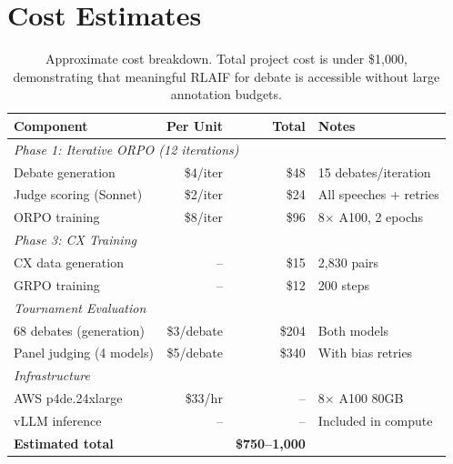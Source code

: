 \section{Cost Estimates}
\label{app:costs}

\begin{table}[h]
\centering
\small
\begin{tabular}{lrrl}
\toprule
\textbf{Component} & \textbf{Per Unit} & \textbf{Total} & \textbf{Notes} \\
\midrule
\multicolumn{4}{l}{\textit{Phase 1: Iterative ORPO (12 iterations)}} \\
Debate generation & \$4/iter & \$48 & 15 debates/iteration \\
Judge scoring (Sonnet) & \$2/iter & \$24 & All speeches + retries \\
ORPO training & \$8/iter & \$96 & 8$\times$ A100, 2 epochs \\
\midrule
\multicolumn{4}{l}{\textit{Phase 3: CX Training}} \\
CX data generation & -- & \$15 & 2,830 pairs \\
GRPO training & -- & \$12 & 200 steps \\
\midrule
\multicolumn{4}{l}{\textit{Tournament Evaluation}} \\
68 debates (generation) & \$3/debate & \$204 & Both models \\
Panel judging (4 models) & \$5/debate & \$340 & With bias retries \\
\midrule
\multicolumn{4}{l}{\textit{Infrastructure}} \\
AWS p4de.24xlarge & \$33/hr & -- & 8$\times$ A100 80GB \\
vLLM inference & -- & -- & Included in compute \\
\midrule
\textbf{Estimated total} & & \textbf{\$750--1,000} & \\
\bottomrule
\end{tabular}
\caption{Approximate cost breakdown. Total project cost is under \$1,000,
demonstrating that meaningful RLAIF for debate is accessible without
large annotation budgets.}
\end{table}
